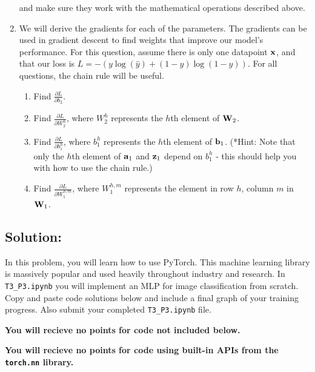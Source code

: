 \documentclass[submit]{harvardml}
\begin{document}
\begin{problem}
\begin{enumerate}
      and make sure they work with the mathematical operations described above.
      
    \item  We will derive the gradients for each of the parameters.  The gradients can be used in gradient descent to find weights that improve our model's performance. For this question, assume there is only one datapoint $\bold{x}$, and that our loss is $L = -(y \log (\hat{y}) + (1 - y) \log (1 - \hat{y}))$. For all questions, the chain rule will be useful.
    \begin{enumerate}
        \item Find $\frac{\partial L}{\partial b_2}$. 
        
        \item Find $\frac{\partial L}{\partial W_2^h}$, where $W_2^h$ represents the $h$th element of $\bold{W}_2$.
        
        \item Find $\frac{\partial L}{\partial b_1^h}$, where $b_1^h$ represents the $h$th element of $\bold{b}_1$. (*Hint: Note that only the $h$th element of $\bold{a}_1$ and $\bold{z}_1$ depend on $b_1^h$ - this should help you with how to use the chain rule.)
        
        \item Find $\frac{\partial L}{\partial W_1^{h,m}}$, where  $W_1^{h,m}$ represents the element in row $h$, column $m$ in $\bold{W}_1$.
    
    \end{enumerate}
    \end{enumerate}
    
    \end{problem}

\subsection*{Solution:}



\newpage

\begin{problem}
  In this problem, you will learn how to use PyTorch. This machine learning library is massively popular and used heavily throughout industry and research. In \verb|T3_P3.ipynb| you will implement an MLP for image classification from scratch. Copy and paste code solutions below and include a final graph of your training progress. Also submit your completed \verb|T3_P3.ipynb| file.

  {\bfseries You will recieve no points for code not included below.}

  {\bfseries You will recieve no points for code using built-in APIs from the \verb|torch.nn| library.}
  
\end{problem}
\end{document}
